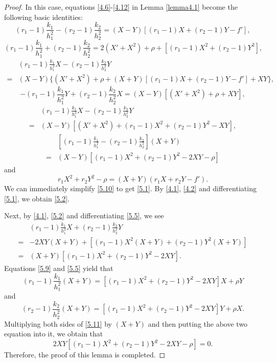 \documentclass{amsart}
\theoremstyle{definition}
\theoremstyle{remark}
\numberwithin{equation}{section}
\begin{document}
	\begin{proof}
In this case, equations \eqref{4.6}-\eqref{4.12} in Lemma \ref{lemma4.1} become the following basic identities:
\begin{equation}\label{5.4}
(r_1-1)\frac{k_1}{h^2_1}-(r_2-1)\frac{k_2}{h^2_2}=(X-Y)[ (r_1-1)X+(r_2-1)Y-f' ],
\end{equation}
\begin{equation}\label{5.5}
(r_1-1)\frac{k_1}{h^2_1}+ (r_2-1)\frac{k_2}{h^2_2}
=2(X'+X^2 ) +\rho+[ (r_1-1)X^2+(r_2-1)Y^2 ],
\end{equation}
\begin{equation}\label{5.6}
\begin{aligned}
&(r_1-1)\frac{k_1}{h^2_1}X- (r_2-1)\frac{k_2}{h^2_2}Y\\
=&(X-Y)\{ (X'+X^2 ) +\rho+(X+Y) [ (r_1-1)X+(r_2-1)Y-f']+XY\},
\end{aligned}
\end{equation}
\begin{equation}\label{5.7}
-(r_1-1)\frac{k_1}{h^2_1}Y+(r_2-1)\frac{k_2}{h^2_2}X
=(X-Y)[(X'+X^2 )+\rho+XY],
\end{equation}
\begin{equation}\label{5.8}
\begin{aligned}
&(r_1-1)\frac{k_1}{h^2_1}X- (r_2-1)\frac{k_2}{h^2_2}Y\\
=&(X-Y)\left[(X'+X^2 )+(r_1-1)X^2+(r_2-1)Y^2-XY\right],
\end{aligned}
\end{equation}
\begin{equation}\label{5.9}
\begin{aligned}
&\left[(r_1-1)\frac{k_1}{h^2_1}- (r_2-1)\frac{k_2}{h^2_2} \right](X+Y)\\
=&(X-Y)\left[(r_1-1)X^2+(r_2-1)Y^2-2XY-\rho \right]
\end{aligned}
\end{equation}	
and 
\begin{equation}\label{5.10}
r_1X^2+r_2Y^2-\rho=(X+Y)\left( r_1X+r_2Y-f' \right).
\end{equation}
We can immediately simplify \eqref{5.10} to get \eqref{5.1}.
By \eqref{4.1}, \eqref{4.2} and differentiating \eqref{5.1}, we obtain \eqref{5.2}.

	Next, by \eqref{4.1}, \eqref{5.2} and differentiating \eqref{5.5}, we see	
	\begin{equation}\label{5.11}
	\begin{aligned}
	&(r_1-1)\frac{k_1}{h^2_1}X+(r_2-1)\frac{k_2}{h^2_2}Y\\
	=&-2XY(X+Y)+[(r_1-1)X^2(X+Y)+(r_2-1)Y^2(X+Y)]\\
	=&(X+Y)[(r_1-1)X^2+(r_2-1)Y^2-2XY].
	\end{aligned}
	\end{equation}	
	Equations \eqref{5.9} and \eqref{5.5} yield that
	\[
	(r_1-1)\frac{k_1}{h^2_1}(X+Y)=[(r_1-1)X^2+(r_2-1)Y^2-2XY]X+\rho Y
	\]
	and
	\[
	(r_2-1)\frac{k_2}{h^2_2}(X+Y)=[(r_1-1)X^2+(r_2-1)Y^2-2XY]Y+\rho X.
	\]
 Multiplying both sides of \eqref{5.11} by $(X+Y)$ and then putting the above two equation into it, we obtain that
	\[
	2XY[(r_1-1)X^2+(r_2-1)Y^2-2XY-\rho]=0.
	\]
	Therefore, the proof of this lemma is completed.
\end{proof}
\end{document}

